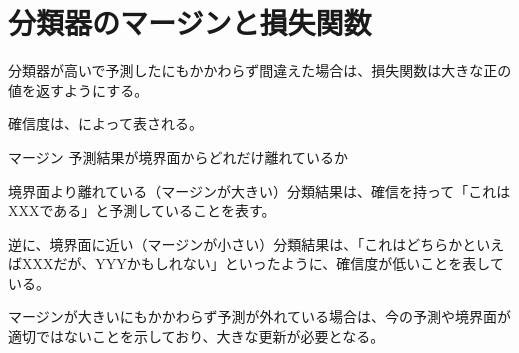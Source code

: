 \documentclass[../../../topic_machine-learning]{subfiles}
\begin{document}
\sectionline
\section{分類器のマージンと損失関数}

分類器が高いで予測したにもかかわらず間違えた場合は、損失関数は大きな正の値を返すようにする。

\br

確信度は、によって表される。

\begin{definition}{マージン}
  予測結果が境界面からどれだけ離れているか
\end{definition}

境界面より離れている（マージンが大きい）分類結果は、確信を持って「これはXXXである」と予測していることを表す。

逆に、境界面に近い（マージンが小さい）分類結果は、「これはどちらかといえばXXXだが、YYYかもしれない」といったように、確信度が低いことを表している。

\br

マージンが大きいにもかかわらず予測が外れている場合は、今の予測や境界面が適切ではないことを示しており、大きな更新が必要となる。
\end{document}
